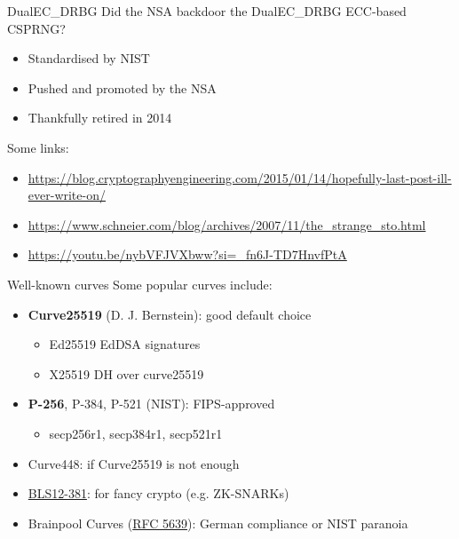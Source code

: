 \begin{frame}{DualEC\_DRBG}
  Did the NSA backdoor the DualEC\_DRBG ECC-based CSPRNG?
  \begin{itemize}[<+(1)->]
    \item Standardised by NIST
    \item Pushed and promoted by the NSA
    \item Thankfully retired in 2014
  \end{itemize}

  \pause
  Some links:
  \begin{itemize}
    \item \url{https://blog.cryptographyengineering.com/2015/01/14/hopefully-last-post-ill-ever-write-on/}
    \item \url{https://www.schneier.com/blog/archives/2007/11/the_strange_sto.html}
    \item \url{https://youtu.be/nybVFJVXbww?si=_fn6J-TD7HnvfPtA}
  \end{itemize}
\end{frame}

\begin{frame}{Well-known curves}
  Some popular curves include:
  \begin{itemize}[<+(1)->]
    \item \textbf{Curve25519} (D. J. Bernstein): good default choice
    \begin{itemize}
      \item Ed25519 EdDSA signatures
      \item X25519 DH over curve25519
    \end{itemize}
    \item \textbf{P-256}, P-384, P-521 (NIST): FIPS-approved
    \begin{itemize}
      \item secp256r1, secp384r1, secp521r1 
    \end{itemize}
    \item Curve448: if Curve25519 is not enough
    \item \href{https://hackmd.io/@benjaminion/bls12-381}{BLS12-381}: for fancy crypto (e.g. ZK-SNARKs)
    \item Brainpool Curves (\href{https://datatracker.ietf.org/doc/html/rfc5639}{RFC 5639}): German compliance or NIST paranoia
  \end{itemize}
\end{frame}

